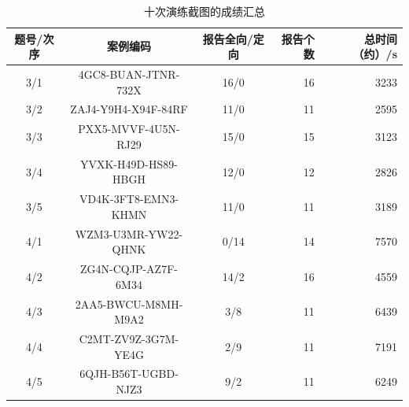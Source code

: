 \begin{table}[H]\centering\caption{十次演练截图的成绩汇总}\label{tab:practice}
\small\setlength{\tabcolsep}{4pt}\begin{tabular}{cccrr}\toprule
题号/次序 & 案例编码 & 报告全向/定向 & 报告个数 & 总时间（约）/s\\\midrule
3/1 & 4GC8-BUAN-JTNR-732X & 16/0 & 16 & 3233\\
3/2 & ZAJ4-Y9H4-X94F-84RF & 11/0 & 11 & 2595\\
3/3 & PXX5-MVVF-4U5N-RJ29 & 15/0 & 15 & 3123\\
3/4 & YVXK-H49D-HS89-HBGH & 12/0 & 12 & 2826\\
3/5 & VD4K-3FT8-EMN3-KHMN & 11/0 & 11 & 3189\\
4/1 & WZM3-U3MR-YW22-QHNK & 0/14 & 14 & 7570\\
4/2 & ZG4N-CQJP-AZ7F-6M34 & 14/2 & 16 & 4559\\
4/3 & 2AA5-BWCU-M8MH-M9A2 & 3/8 & 11 & 6439\\
4/4 & C2MT-ZV9Z-3G7M-YE4G & 2/9 & 11 & 7191\\
4/5 & 6QJH-B56T-UGBD-NJZ3 & 9/2 & 11 & 6249\\
\bottomrule\end{tabular}
\end{table}
